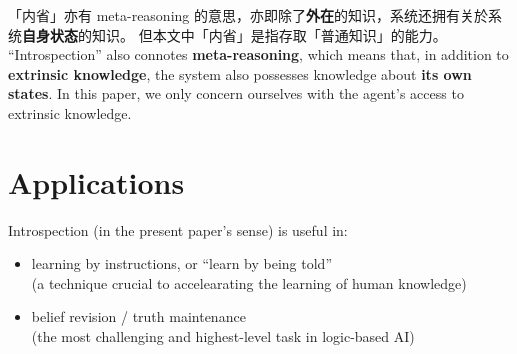 \documentclass[orivec]{llncs}
\begin{document}
\ifdefined\chinchin
「内省」亦有 meta-reasoning 的意思，亦即除了\textbf{外在}的知识，系统还拥有关於系统\textbf{自身状态}的知识。 但本文中「内省」是指存取「普通知识」的能力。
\else
``Introspection'' also connotes \textbf{meta-reasoning}, which means that, in addition to \textbf{extrinsic knowledge}, the system also possesses knowledge about \textbf{its own states}.  In this paper, we only concern ourselves with the agent's access to extrinsic knowledge.
\fi

\section{Applications}

Introspection (in the present paper's sense) is useful in:
\begin{itemize}
	\item learning by instructions, or ``learn by being told'' \\
	(a technique crucial to accelearating the learning of human knowledge)
	\item belief revision / truth maintenance \\
	(the most challenging and highest-level task in logic-based AI)
\end{itemize}
\end{document}
